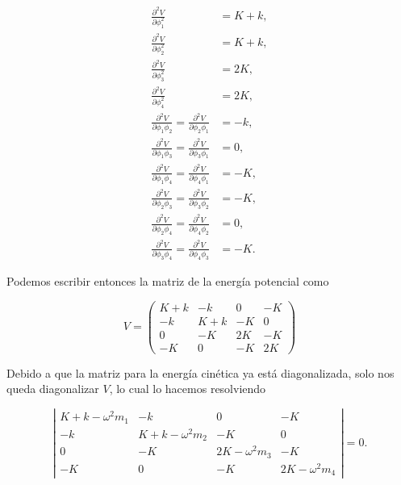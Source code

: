 \documentclass[a4paper,10pt]{article}
\numberwithin{equation}{section}
\begin{document}
\begin{align*}
 \frac{\partial^2 V}{\partial \phi_1^2} &= K+k, \\
 \frac{\partial^2 V}{\partial \phi_2^2} &= K+k, \\
 \frac{\partial^2 V}{\partial \phi_3^2} &= 2K, \\
 \frac{\partial^2 V}{\partial \phi_4^2} &= 2K, \\
 \frac{\partial^2 V}{\partial \phi_1\phi_2} = \frac{\partial^2 V}{\partial \phi_2\phi_1}&= -k, \\
 \frac{\partial^2 V}{\partial \phi_1\phi_3} = \frac{\partial^2 V}{\partial \phi_3\phi_1}  &= 0, \\
 \frac{\partial^2 V}{\partial \phi_1\phi_4} =  \frac{\partial^2 V}{\partial \phi_4\phi_1} &= -K, \\
 \frac{\partial^2 V}{\partial \phi_2\phi_3} =  \frac{\partial^2 V}{\partial \phi_3\phi_2} &= -K, \\
 \frac{\partial^2 V}{\partial \phi_2\phi_4} =  \frac{\partial^2 V}{\partial \phi_4\phi_2} &= 0, \\ 
 \frac{\partial^2 V}{\partial \phi_3\phi_4} =  \frac{\partial^2 V}{\partial \phi_4\phi_3} &= -K.
\end{align*}

Podemos escribir entonces la matriz de la energía potencial como

\begin{equation}
 V = \begin{pmatrix}
      K+k & -k & 0 & -K \\
      -k & K+k & - K & 0 \\
      0 & - K & 2K & - K \\
      -K & 0 & - K & 2K
     \end{pmatrix}
\end{equation}

Debido a que la matriz para la energía cinética ya está diagonalizada, solo nos queda 
diagonalizar $V$, lo cual lo hacemos resolviendo

\begin{equation}
 \left|\begin{matrix}
      K+k - \omega^2m_1 & -k & 0 & -K \\
      -k & K+k - \omega^2m_2 & - K & 0 \\
      0 & - K & 2K -  \omega^2m_3 & - K \\
      -K & 0 & - K & 2K -  \omega^2m_4
     \end{matrix}\right| = 0.
\end{equation}
\end{document}
